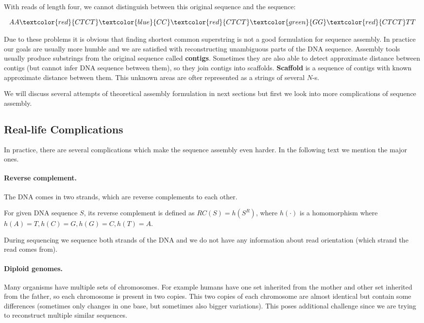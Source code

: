 With reads of length four, we cannot distinguish between this original sequence and
the sequence:

$$AA\textcolor{red}{CTCT}\textcolor{blue}{CC}\textcolor{red}{CTCT}\textcolor{green}{GG}\textcolor{red}{CTCT}TT$$

Due to these problems it is obvious that finding shortest common superstring
is not a good formulation for sequence assembly. 
In practice our goals are usually more humble and we are satisfied with reconstructing
unambiguous parts of the DNA sequence. Assembly tools
usually produce substrings from the original sequence called {\bf contigs}.
Sometimes they are also able to detect approximate distance between contigs
(but cannot infer DNA sequence between them), so they join
contigs into scaffolds. {\bf Scaffold} is a sequence of contigs with known
approximate distance between them. 
This unknown areas are ofter represented as a strings of several $N$-s.

We will discuss several attempts of theoretical assembly formulation in
next sections but first we look into more complications of sequence assembly.

\subsection{Real-life Complications}

In practice, there are several complications which make the sequence assembly even harder.
In the following text we mention the major ones.

\paragraph{Reverse complement.} 
The DNA comes in two strands, which are reverse complements to each other.

\begin{definition}
For given DNA sequence $S$, its reverse complement is defined as
$RC(S) = h(S^R)$, where $h(\cdot)$ is a homomorphism where $h(A) = T, h(C) = G,
h(G) = C, h(T) = A$. 
\end{definition}

During sequencing we sequence both strands of the DNA and we do not have
any information about read orientation (which strand the read comes from).

\paragraph{Diploid genomes.}
Many organisms have multiple sets of chromosomes. For example humans have one set
inherited from the mother and other set inherited from the father, so each chromosome
is present in two copies. This two copies of each chromosome are almost identical but
contain some differences (sometimes only changes in one base, but sometimes also
bigger variations). This poses additional challenge since we are trying to reconstruct
multiple similar sequences.

